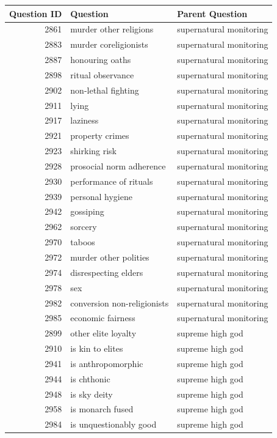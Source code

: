 \begin{tabular}{rll}
\toprule
Question ID & Question & Parent Question \\
\midrule
2861 & murder other religions & supernatural monitoring \\
2883 & murder coreligionists & supernatural monitoring \\
2887 & honouring oaths & supernatural monitoring \\
2898 & ritual observance & supernatural monitoring \\
2902 & non-lethal fighting & supernatural monitoring \\
2911 & lying & supernatural monitoring \\
2917 & laziness & supernatural monitoring \\
2921 & property crimes & supernatural monitoring \\
2923 & shirking risk & supernatural monitoring \\
2928 & prosocial norm adherence & supernatural monitoring \\
2930 & performance of rituals & supernatural monitoring \\
2939 & personal hygiene & supernatural monitoring \\
2942 & gossiping & supernatural monitoring \\
2962 & sorcery & supernatural monitoring \\
2970 & taboos & supernatural monitoring \\
2972 & murder other polities & supernatural monitoring \\
2974 & disrespecting elders & supernatural monitoring \\
2978 & sex & supernatural monitoring \\
2982 & conversion non-religionists & supernatural monitoring \\
2985 & economic fairness & supernatural monitoring \\
2899 & other elite loyalty & supreme high god \\
2910 & is kin to elites & supreme high god \\
2941 & is anthropomorphic & supreme high god \\
2944 & is chthonic & supreme high god \\
2948 & is sky deity & supreme high god \\
2958 & is monarch fused & supreme high god \\
2984 & is unquestionably good & supreme high god \\

\end{tabular}
